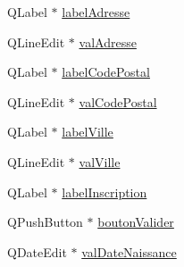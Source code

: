 \begin{DoxyCompactItemize}
Q\-Label $\ast$ \hyperlink{class_ui___dialog_inscription_ad5bb5ca7f98ec799abd4a83c56fff220}{label\-Adresse}
\item 
Q\-Line\-Edit $\ast$ \hyperlink{class_ui___dialog_inscription_ac5ffebadc65a04992a0c00ffcdd8378c}{val\-Adresse}
\item 
Q\-Label $\ast$ \hyperlink{class_ui___dialog_inscription_a8f0a88b8bbc71f40331af3dc6672b605}{label\-Code\-Postal}
\item 
Q\-Line\-Edit $\ast$ \hyperlink{class_ui___dialog_inscription_a3f257084e12a690ae6424651f2ca0906}{val\-Code\-Postal}
\item 
Q\-Label $\ast$ \hyperlink{class_ui___dialog_inscription_a21cf68832bf725cc2cb702a5d4338173}{label\-Ville}
\item 
Q\-Line\-Edit $\ast$ \hyperlink{class_ui___dialog_inscription_a97278f7c4479f5eebee4d44527362cd5}{val\-Ville}
\item 
Q\-Label $\ast$ \hyperlink{class_ui___dialog_inscription_a452e0b0adff0141927a345e5c92ca4b1}{label\-Inscription}
\item 
Q\-Push\-Button $\ast$ \hyperlink{class_ui___dialog_inscription_abcf7cc88e00f9004f42b1bea602d584a}{bouton\-Valider}
\item 
Q\-Date\-Edit $\ast$ \hyperlink{class_ui___dialog_inscription_a275d934e6e7ad6848d05f4f92fb28289}{val\-Date\-Naissance}
\end{DoxyCompactItemize}


